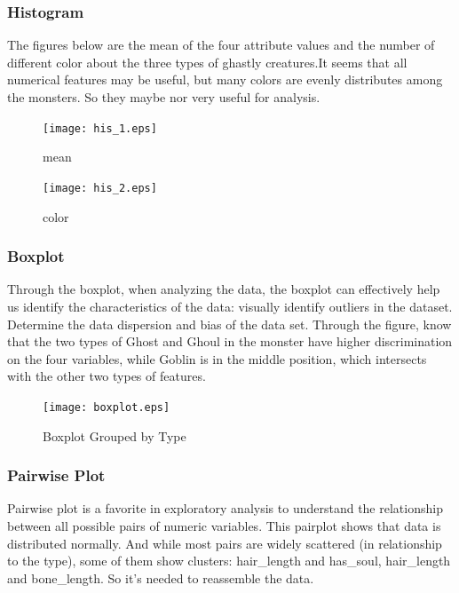\subsubsection{ Histogram}
The figures below are the mean of the four attribute values  and the number of different color about the three types of ghastly creatures.It seems that all numerical features may be useful, but many colors are evenly distributes among the monsters. So they maybe nor very useful for analysis.\\


\begin{figure}[htbp]\centering
	\texttt{[image: his\_1.eps]}
	\caption{mean}
\end{figure}


\begin{figure}[htbp]\centering
	\texttt{[image: his\_2.eps]}
	\caption{color}
\end{figure}


\subsubsection{Boxplot}
Through the boxplot, when analyzing the data, the boxplot can effectively help us identify the characteristics of the data: visually identify outliers in the dataset. Determine the data dispersion and bias of the data set. Through the figure, know that the two types of Ghost and Ghoul in the monster have higher discrimination on the four variables, while Goblin is in the middle position, which intersects with the other two types of features.


\begin{figure}[h]\centering
	\texttt{[image: boxplot.eps]}
	\caption{Boxplot Grouped by Type}
\end{figure}


\subsubsection{Pairwise Plot} 
Pairwise plot is a favorite in exploratory analysis to understand the relationship between all possible pairs of numeric variables. This pairplot shows that data is distributed normally. And while most pairs are widely scattered (in relationship to the type), some of them show clusters: hair_length and has_soul, hair_length and bone_length. So it's needed to reassemble the data.%


